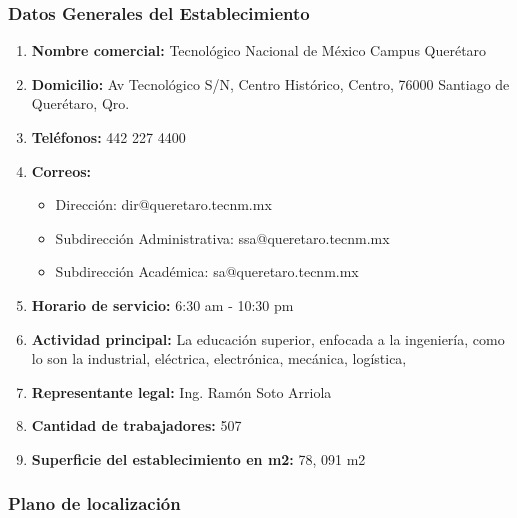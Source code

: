     \subsubsection{Datos Generales del Establecimiento}
    \begin{enumerate}
        \item \textbf{Nombre comercial:} 
        Tecnológico Nacional de México Campus Querétaro
        \item \textbf{Domicilio:} Av Tecnológico S/N, Centro Histórico, Centro, 76000 Santiago de Querétaro, Qro.
        \item \textbf{Teléfonos:} 442 227 4400
        \item \textbf{Correos:}
     
     
     \begin{itemize}
     \item Dirección: 
     dir@queretaro.tecnm.mx
     \item Subdirección Administrativa:
     ssa@queretaro.tecnm.mx
     \item Subdirección Académica: 
     sa@queretaro.tecnm.mx
     \end{itemize}
    
     
        \item \textbf{Horario de servicio:} 6:30 am - 10:30 pm
        \item \textbf{Actividad principal:} La educación superior, enfocada a la ingeniería, como lo son la industrial, eléctrica, electrónica, mecánica, logística,
        \item \textbf{Representante legal:}
         Ing. Ramón Soto Arriola
        \item \textbf{Cantidad de trabajadores:} 507
        
        \item \textbf{Superficie del establecimiento en m2:} 78, 091 m2
    \end{enumerate}
    
    \subsubsection{Plano de localización}
    
